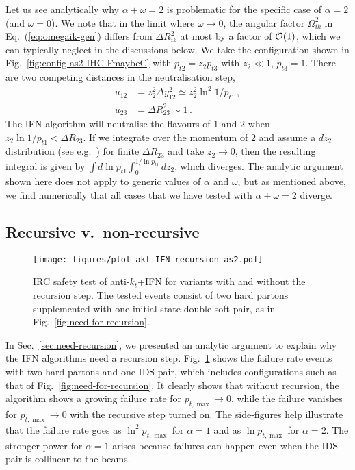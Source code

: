 \documentclass[nofootinbib,twocolumn,preprintnumbers,superscriptaddress,aps]{revtex4-2}
\newcommand{\order}[1]{{\cal O}\!\left(#1\right)}
\newcommand{\lnptmax}{\ln p_{t,\max}}
\newcommand{\ptmax}{p_{t,\max}}
\begin{document}
Let us see analytically why
$\alpha+\omega=2$ is problematic for the specific case of $\alpha=2$
(and $\omega = 0$).
%
We note that in the limit where $\omega \to 0$, the angular
factor $\Omega_{ik}^2$ in Eq.~(\ref{eq:omegaik-gen}) differs from
$\Delta R_{ik}^2$ at most by a factor of $\order{1}$, which we can
typically neglect in the discussions below.
%
We take the configuration shown in Fig.~\ref{fig:config-as2-IHC-FmaybeC}
with $p_{t2} = z_2p_{t3}$ with $z_2 \ll 1$, $p_{t3} = 1$.
%
There are two competing distances in the neutralisation step,
\begin{subequations}
  \begin{align}
    u_{12} &= z_2^2 \Delta y_{12}^2 \simeq z_2^2 \ln^2 1/p_{t1}\,,
    \\
    u_{23} &= \Delta R_{23}^2 \sim 1\,.
  \end{align}
\end{subequations}
%
The IFN algorithm will neutralise the flavours of $1$ and $2$ when
$z_2 \ln 1/p_{t1} < \Delta R_{23}$.
%
If we integrate over the momentum of $2$ and assume a $dz_2$
distribution (see e.g.\ \cite{vanBeekveld:2019prq}) for finite
$\Delta R_{23}$ and take $z_2 \to 0$, then the resulting integral is
given by $\int d\ln p_{t1} \int_0^{1/\ln p_{t1}} dz_2$, which
diverges.
%
The analytic argument shown here does not apply to generic values of
$\alpha$ and $\omega$, but as mentioned above, we find numerically that all
cases that we have tested with $\alpha+\omega=2$ diverge.
%

\subsection{Recursive v.\ non-recursive}
\label{sec:IFN-non-recursive}


\begin{figure}
  \centering
  \texttt{[image: figures/plot-akt-IFN-recursion-as2.pdf]}
  \caption{IRC safety test of anti-$k_t$+IFN for variants with and
    without the recursion step.
    The tested events consist of two hard partons supplemented with one
    initial-state double soft pair, as in Fig.~\ref{fig:need-for-recursion}.
  }
  \label{fig:IFN-no-recursion}
\end{figure}

In Sec.~\ref{sec:need-recursion}, we presented an analytic
argument to explain why the IFN algorithms need a recursion step.
%
Fig.~\ref{fig:IFN-no-recursion} shows the failure rate events with two
hard partons and one IDS pair, which includes configurations such as
that of Fig.~\ref{fig:need-for-recursion}.
%
It clearly shows that without recursion, the algorithm shows a growing
failure rate for $\ptmax \to 0$, while the failure vanishes for
$\ptmax \to 0$ with the recursive step turned on.
%
The side-figures help illustrate that the failure rate goes as
$\ln^2\ptmax$ for $\alpha=1$ and as $\lnptmax$ for $\alpha=2$.
%
The stronger power for $\alpha=1$ arises because failures can happen
even when the IDS pair is collinear to the beams.
\end{document}
